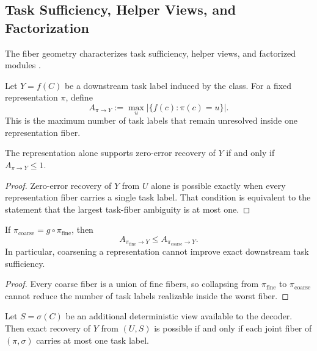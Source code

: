 \subsection{Task Sufficiency, Helper Views, and Factorization}

The fiber geometry characterizes task sufficiency, helper views, and factorized modules \cite{orlitsky2001coding, doshi2010functional}.

\begin{definition}
Let $Y=f(C)$ be a downstream task label induced by the class. For a fixed representation $\pi$, define
\[
A_{\pi \to Y} := \max_u \left|\{f(c) : \pi(c)=u\}\right|.
\]
This is the maximum number of task labels that remain unresolved inside one representation fiber.
\end{definition}

\begin{theorem}\label{thm:task-sufficiency}
The representation alone supports zero-error recovery of $Y$ if and only if $A_{\pi \to Y} \le 1$.
\end{theorem}

\begin{proof}
Zero-error recovery of $Y$ from $U$ alone is possible exactly when every representation fiber carries a single task label. That condition is equivalent to the statement that the largest task-fiber ambiguity is at most one.
\end{proof}

\begin{corollary}\label{cor:task-coarsening-mono}
If $\pi_{\mathrm{coarse}} = g \circ \pi_{\mathrm{fine}}$, then
\[
A_{\pi_{\mathrm{fine}} \to Y} \le A_{\pi_{\mathrm{coarse}} \to Y}.
\]
In particular, coarsening a representation cannot improve exact downstream task sufficiency.
\end{corollary}

\begin{proof}
Every coarse fiber is a union of fine fibers, so collapsing from $\pi_{\mathrm{fine}}$ to $\pi_{\mathrm{coarse}}$ cannot reduce the number of task labels realizable inside the worst fiber.
\end{proof}

\begin{theorem}\label{thm:helper-view-sufficiency}
Let $S=\sigma(C)$ be an additional deterministic view available to the decoder. Then exact recovery of $Y$ from $(U,S)$ is possible if and only if each joint fiber of $(\pi,\sigma)$ carries at most one task label.
\end{theorem}

